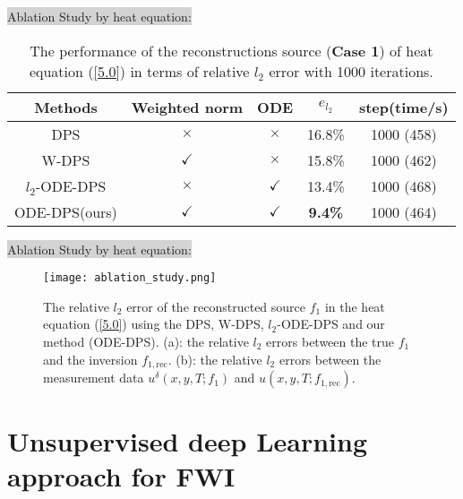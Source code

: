 \documentclass[mathserif,envcountsect,compress,8pt]{beamer}
\begin{document}
\begin{frame}
	\setlength{\parskip}{0.6\baselineskip}
	\colorbox {lightgray}{{\color{blue}Ablation Study by heat equation:}}
	\vspace{50pt}
	\begin{table}[htbp!]
		\centering
		\begin{tabular}{c c c c c }
			\toprule[1pt]
			Methods       & Weighted norm & ODE          & $e_{l_2}$      & step(time/s) \\
			\hline
			DPS           & $\times$      & $\times$     & 16.8\%         & 1000 (458)   \\
			W-DPS         & $\checkmark$  & $\times$     & 15.8\%         & 1000 (462)   \\
			$l_2$-ODE-DPS & $\times$      & $\checkmark$ & 13.4\%         & 1000 (468)   \\
			ODE-DPS(ours) & $\checkmark$  & $\checkmark$ & \textbf{9.4\%} & 1000 (464)   \\
			\bottomrule[1pt]
		\end{tabular}
		\caption{The performance of the reconstructions source (\textbf{Case 1}) of heat equation (\ref{5.0}) in terms of relative $l_2$ error with 1000 iterations.}
		\label{tab:ablation}
	\end{table}
\end{frame}


\begin{frame}
	\setlength{\parskip}{0.6\baselineskip}
	\colorbox {lightgray}{{\color{blue}Ablation Study by heat equation:}}
	\vspace{40pt}
	
	\begin{figure}[H]
		\centering
		\begin{minipage}[t]{0.8\linewidth}
			\centering
			\texttt{[image: ablation\_study.png]}
		\end{minipage}
		\centering
		\caption{The relative $l_2$ error of the reconstructed source $f_1$ in the heat equation (\ref{5.0}) using the DPS, W-DPS, $l_2$-ODE-DPS and our method (ODE-DPS). (a): the relative $l_2$ errors between the true $f_1$ and the inversion $f_{1,\text{rec}}$. (b): the relative $l_2$ errors between the measurement data $u^\delta(x,y,T;f_1)$ and $u(x,y,T;f_{1,\text{rec}})$.}
	\end{figure}
\end{frame}


\section{Unsupervised deep Learning approach for FWI}
\end{document}
